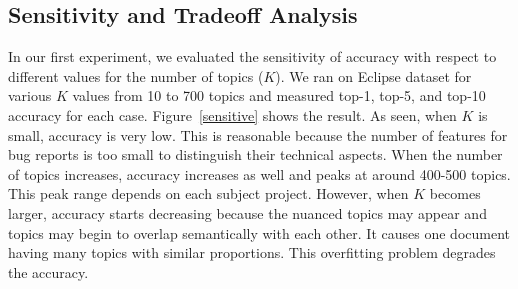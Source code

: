 



\subsection{Sensitivity and Tradeoff Analysis}


In our first experiment, we evaluated the sensitivity of accuracy with
respect to different values for the number of topics ($K$). 
We ran {\model} on Eclipse dataset for various $K$ values from 10 to
700 topics and measured top-1, top-5, and top-10 accuracy for each
case. Figure~\ref{sensitive} shows the result. As seen, when $K$ is
small, accuracy is very low. This is reasonable because the number of
features for bug reports is too small to distinguish their technical
aspects. When the number of topics increases, accuracy increases as
well and peaks at around 400-500 topics. This peak range depends on
each subject project. However, when $K$ becomes larger, accuracy
starts decreasing because the nuanced topics may appear and topics may
begin to overlap semantically with each other. It causes one
document having many topics with similar proportions. This overfitting
problem degrades the accuracy.

